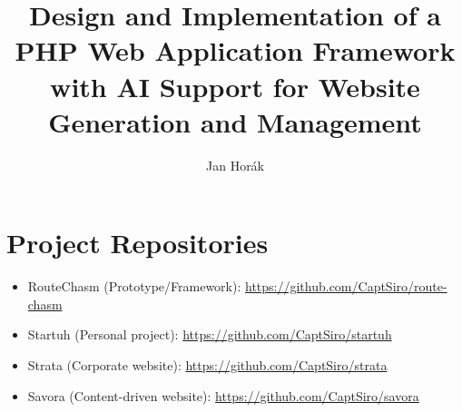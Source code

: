 \documentclass{ctu/class/ctuthesis}
\title{Design and Implementation of a PHP Web Application Framework with AI Support for Website Generation and Management}
\author{Jan Horák}
\begin{document}
    \maketitle

    
    

    \clearpage

    

    \clearpage

    

    \clearpage

    

    \clearpage

    

    \clearpage

    

    \clearpage

    

    \clearpage

    

    \clearpage

    

    \clearpage

    \printbibliography[title={References}]

    \clearpage
    \appendix

    \chapter{Project Repositories}\label{ch:project-repositories}

    \begin{itemize}
        \item RouteChasm (Prototype/Framework): \url{https://github.com/CaptSiro/route-chasm}
        \item Startuh (Personal project): \url{https://github.com/CaptSiro/startuh}
        \item Strata (Corporate website): \url{https://github.com/CaptSiro/strata}
        \item Savora (Content-driven website): \url{https://github.com/CaptSiro/savora}
    \end{itemize}
\end{document}
